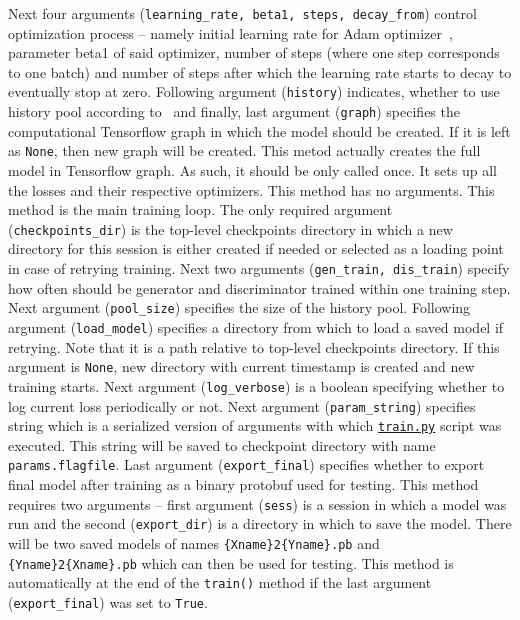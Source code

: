 \begin{itemize}
\begin{description}
Next four arguments (\texttt{learning\_rate, beta1, steps, decay\_from}) control optimization process -- namely initial learning rate for Adam optimizer~\cite{adam}, parameter beta1 of said optimizer, number of steps (where one step corresponds to one batch) and number of steps after which the learning rate starts to decay to eventually stop at zero. Following argument (\texttt{history}) indicates, whether to use history pool according to~\cite{historypool} and finally, last argument (\texttt{graph}) specifies the computational Tensorflow graph in which the model should be created. If it is left as \texttt{None}, then new graph will be created.
 This metod actually creates the full model in Tensorflow graph. As such, it should be only called once. It sets up all the losses and their respective optimizers. This method has no arguments.
 This method is the main training loop. The only required argument (\texttt{checkpoints\_dir}) is the top-level checkpoints directory in which a new directory for this session is either created if needed or selected as a loading point in case of retrying training. Next two arguments (\texttt{gen\_train, dis\_train}) specify how often should be generator and discriminator trained within one training step. Next argument (\texttt{pool\_size}) specifies the size of the history pool. Following argument (\texttt{load\_model}) specifies a directory from which to load a saved model if retrying. Note that it is a path relative to top-level checkpoints directory. If this argument is \texttt{None}, new directory with current timestamp is created and new training starts. Next argument (\texttt{log\_verbose}) is a boolean specifying whether to log current loss periodically or not. Next argument (\texttt{param\_string}) specifies string which is a serialized version of arguments with which \hyperref[trainpy]{\texttt{train.py}} script was executed. This string will be saved to checkpoint directory with name \texttt{params.flagfile}. Last argument (\texttt{export\_final}) specifies whether to export final model after training as a binary protobuf used for testing.
 This method requires two arguments -- first argument (\texttt{sess}) is a session in which a model was run and the second (\texttt{export\_dir}) is a directory in which to save the model. There will be two saved models of names \texttt{\{Xname\}2\{Yname\}.pb} and \texttt{\{Yname\}2\{Xname\}.pb} which can then be used for testing. This method is automatically at the end of the \texttt{train()} method if the last argument (\texttt{export\_final}) was set to \texttt{True}.

\end{description}
\end{itemize}
